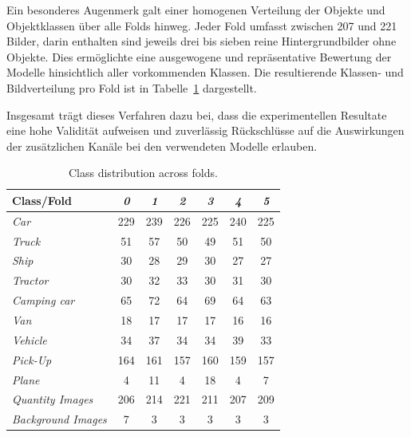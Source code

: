 Ein besonderes Augenmerk galt einer homogenen Verteilung der Objekte und Objektklassen über alle Folds hinweg. Jeder Fold umfasst zwischen 207 und 221 Bilder, darin enthalten sind jeweils drei bis sieben reine Hintergrundbilder ohne Objekte. Dies ermöglichte eine ausgewogene und repräsentative Bewertung der Modelle hinsichtlich aller vorkommenden Klassen. Die resultierende Klassen- und Bildverteilung pro Fold ist in Tabelle~\ref{tab:fold_distribution} dargestellt.

Insgesamt trägt dieses Verfahren dazu bei, dass die experimentellen Resultate eine hohe Validität aufweisen und zuverlässig Rückschlüsse auf die Auswirkungen der zusätzlichen Kanäle bei den verwendeten Modelle erlauben.


\begin{table}[h!]
\centering
\begin{tabular}{lcccccc}
\textbf{Class/Fold} & \textit{0} & \textit{1} & \textit{2} & \textit{3} & \textit{4} & \textit{5} \\
\hline
\textit{Car}              & 229 & 239 & 226 & 225 & 240 & 225 \\
\textit{Truck}            & 51  & 57  & 50  & 49  & 51  & 50  \\
\textit{Ship}             & 30  & 28  & 29  & 30  & 27  & 27  \\
\textit{Tractor}          & 30  & 32  & 33  & 30  & 31  & 30  \\
\textit{Camping car}      & 65  & 72  & 64  & 69  & 64  & 63  \\
\textit{Van}              & 18  & 17  & 17  & 17  & 16  & 16  \\
\textit{Vehicle}          & 34  & 37  & 34  & 34  & 39  & 33  \\
\textit{Pick-Up}          & 164 & 161 & 157 & 160 & 159 & 157 \\
\textit{Plane}            & 4   & 11  & 4   & 18  & 4   & 7   \\
\textit{Quantity Images}  & 206 & 214 & 221 & 211 & 207 & 209 \\
\textit{Background Images}& 7   & 3   & 3   & 3   & 3   & 3   \\
\hline
\end{tabular}
\caption{Class distribution across folds.}
\label{tab:fold_distribution}
\end{table}
        
